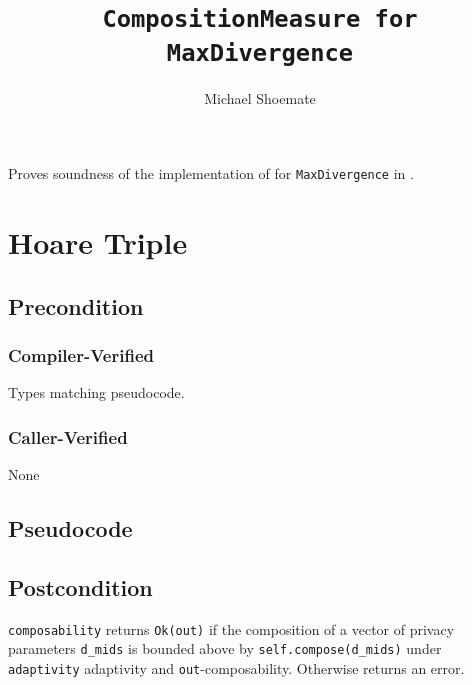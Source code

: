 \documentclass{article}
\title{\texttt{CompositionMeasure for MaxDivergence}}
\author{Michael Shoemate}
\date{}
\begin{document}
\maketitle

\contrib
Proves soundness of the implementation of  
for \texttt{MaxDivergence} in .

\section{Hoare Triple}
\subsection*{Precondition}
\subsubsection*{Compiler-Verified}
Types matching pseudocode.


\subsubsection*{Caller-Verified}
None

\subsection*{Pseudocode}


\subsection*{Postcondition}
\begin{theorem}
  \texttt{composability} returns \texttt{Ok(out)} if the composition of a vector of privacy parameters \texttt{d\_mids} 
  is bounded above by \texttt{self.compose(d\_mids)} under \texttt{adaptivity} adaptivity and \texttt{out}-composability.
  Otherwise returns an error.
\end{theorem}
\end{document}

